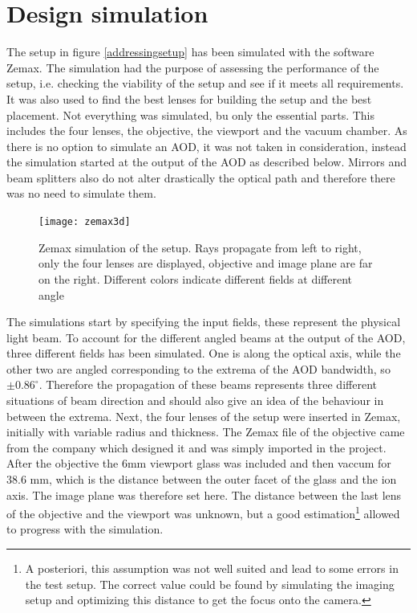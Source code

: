 \section{Design simulation}
The setup in figure \ref{addressingsetup} has been simulated with the software Zemax. The simulation had the purpose of assessing the performance of the setup, i.e. checking the viability of the setup and see if it meets all requirements. It was also used to find the best lenses for building the setup and the best placement. Not everything was simulated, bu only the essential parts. This includes the four lenses, the objective, the viewport and the vacuum chamber. As there is no option to simulate an AOD, it was not taken in consideration, instead the simulation started at the output of the AOD as described below. Mirrors and beam splitters also do not alter drastically the optical path and therefore there was no need to simulate them.
\begin{figure}[H]
\centering
\texttt{[image: zemax3d]}
\caption{Zemax simulation of the setup. Rays propagate from left to right, only the four lenses are displayed, objective and image plane are far on the right. Different colors indicate different fields at different angle}
\label{zemaxview}
\end{figure}
The simulations start by specifying the input fields, these represent the physical light beam. To account for the different angled beams at the output of the AOD, three different fields has been simulated. One is along the optical axis, while the other two are angled corresponding to the extrema of the AOD bandwidth, so $\pm0.86^{\circ}$. Therefore the propagation of these beams represents three different situations of beam direction and should also give an idea of the behaviour in between the extrema. Next, the four lenses of the setup were inserted in Zemax, initially with variable radius and thickness. The Zemax file of the objective came from the company which designed it and was simply imported in the project. After the objective the 6mm viewport glass was included and then vaccum for 38.6 mm, which is the distance between the outer facet of the glass and the ion axis. The image plane was therefore set here. The distance between the last lens of the objective and the viewport was unknown, but a good estimation\footnote{A posteriori, this assumption was not well suited and lead to some errors in the test setup. The correct value could be found by simulating the imaging setup and optimizing this distance to get the focus onto the camera.} allowed to progress with the simulation.
